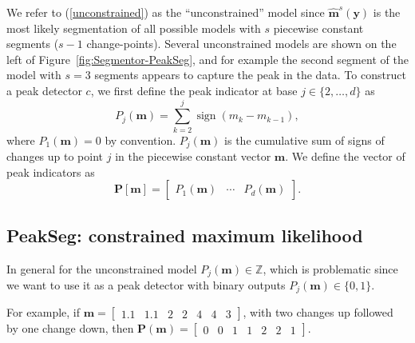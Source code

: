 \documentclass{article}
\DeclareMathOperator*{\sign}{sign}
\newcommand{\ZZ}{\mathbb Z}
\begin{document}
We refer to (\ref{unconstrained}) as the ``unconstrained'' model
since $\mathbf{\hat m}^s(\mathbf y)$ is the most likely segmentation
of all possible models with $s$ piecewise constant segments ($s-1$
change-points). Several unconstrained models are shown on the left of
Figure~\ref{fig:Segmentor-PeakSeg}, and for example the second segment
of the model with $s=3$ segments appears to capture the peak in the
data.
To construct a peak detector $c$, we first define the peak indicator at base
$j\in\{2, \dots, d\}$ as
\begin{equation}
  \label{eq:peaks}
  P_j(\mathbf m) = \sum_{k=2}^j \sign( m_{k} - m_{k-1} ),
\end{equation}
where $P_1(\mathbf m)=0$ by convention. $P_j(\mathbf m)$ is the
cumulative sum of signs of changes up to point $j$ in the piecewise
constant vector $\mathbf m$. We define the vector of peak indicators
as
\begin{equation}
  \mathbf
P[\mathbf m] = \left[\begin{array}{ccc} P_1(\mathbf m) & \cdots &
    P_d(\mathbf m)
\end{array}\right].
\end{equation}

\subsection{PeakSeg: constrained maximum likelihood}
\label{sec:constrained}

In general for the unconstrained model $P_j(\mathbf m)\in\ZZ$, which
is problematic since we want to use it as a peak detector with binary
outputs $P_j(\mathbf m)\in \{0, 1\}$. 

For example, if $\mathbf m = \left[\begin{array}{ccccccc}1.1 &
    1.1 & 2 & 2 & 4 & 4 & 3\end{array}\right]$, with two changes up
followed by one change down, then $\mathbf P(\mathbf m) =
\left[\begin{array}{ccccccc}0 & 0 & 1 & 1 & 2 & 2 &
    1 \end{array}\right]$.

\end{document}
